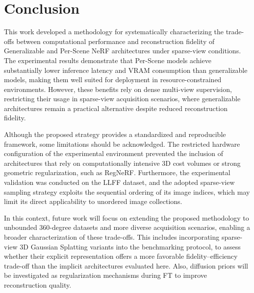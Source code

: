 \section{Conclusion}

This work developed a methodology for systematically characterizing the trade-offs between computational performance and reconstruction fidelity of Generalizable and Per-Scene NeRF architectures under sparse-view conditions. The experimental results demonstrate that Per-Scene models achieve substantially lower inference latency and VRAM consumption than generalizable models, making them well suited for deployment in resource-constrained environments. However, these benefits rely on dense multi-view supervision, restricting their usage in sparse-view acquisition scenarios, where generalizable architectures remain a practical alternative despite reduced reconstruction fidelity.

Although the proposed strategy provides a standardized and reproducible framework, some limitations should be acknowledged. The restricted hardware configuration of the experimental environment prevented the inclusion of architectures that rely on computationally intensive 3D cost volumes or strong geometric regularization, such as RegNeRF. Furthermore, the experimental validation was conducted on the LLFF dataset, and the adopted sparse-view sampling strategy exploits the sequential ordering of its image indices, which may limit its direct applicability to unordered image collections.

In this context, future work will focus on extending the proposed methodology to unbounded 360-degree datasets and more diverse acquisition scenarios, enabling a broader characterization of these trade-offs. This includes incorporating sparse-view 3D Gaussian Splatting variants \cite{seo2026improvingsparseview3dgsgeneralization,song2025d2gsdepthanddensityguidedgaussian} into the benchmarking protocol, to assess whether their explicit representation offers a more favorable fidelity--efficiency trade-off than the implicit architectures evaluated here. Also, diffusion priors will be investigated as regularization mechanisms during FT to improve reconstruction quality.